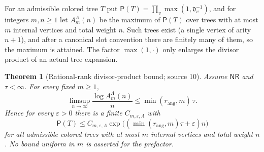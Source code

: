 \documentclass[11pt,letterpaper]{article}
\newtheorem{theorem}{Theorem}[section]
\theoremstyle{definition}
\theoremstyle{remark}
\newcommand{\eps}{\varepsilon}
\newcommand{\nres}{\mathsf{NR}}
\newcommand{\rang}{r_{\mathrm{ang}}}
\numberwithin{equation}{section}
\begin{document}
For an admissible colored tree $T$ put
$\mathsf P(T)=\prod_{v}\max(1,\mathfrak d_v^{-1})$, and for integers
$m,n\ge1$ let $A^{\Lambda}_m(n)$ be the maximum of $\mathsf P(T)$ over trees
with at most $m$ internal vertices and total weight $n$. Such trees exist (a
single vertex of arity $n+1$), and after a canonical slot convention there
are finitely many of them, so the maximum is attained. The factor
$\max(1,\cdot)$ only enlarges the divisor product of an actual tree
expansion.

\begin{theorem}[Rational-rank divisor-product bound; source 10]
\label{dyn:nsc:thm:products}
Assume $\nres$ and $\tau<\infty$. For every fixed $m\ge1$,
\begin{equation}\label{dyn:nsc:eq:limsup}
 \limsup_{n\to\infty}\frac{\log A^{\Lambda}_m(n)}{n}\le\min(\rang,m)\,\tau .
\end{equation}
Hence for every $\eps>0$ there is a finite $C_{m,\eps,\Lambda}$ with
\begin{equation}\label{dyn:nsc:eq:products}
 \mathsf P(T)\le C_{m,\eps,\Lambda}\exp\bigl((\min(\rang,m)\tau+\eps)n\bigr)
\end{equation}
for all admissible colored trees with at most $m$ internal vertices and total
weight $n$. No bound uniform in $m$ is asserted for the prefactor.
\end{theorem}
\end{document}
